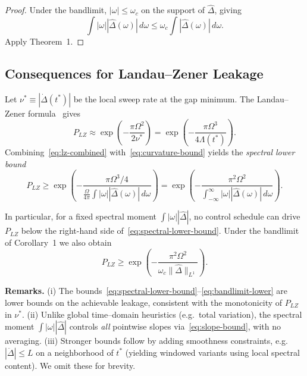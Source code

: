 \documentclass[11pt]{article}
\begin{document}
\begin{proof}
Under the bandlimit, $|\omega| \le \omega_c$ on the support of $\hat{\Delta}$, giving
\[
    \int |\omega| |\hat{\Delta}(\omega)|\, d\omega \le \omega_c \int |\hat{\Delta}(\omega)|\, d\omega.
\]
Apply Theorem~1.
\end{proof}

\subsection{Consequences for Landau--Zener Leakage}

Let $\nu^* \equiv |\dot{\Delta}(t^*)|$ be the local sweep rate at the gap minimum. The Landau--Zener formula~\cite{landau1932,zener1932,stueckelberg1932,majorana1932} gives
\begin{equation}
    P_{LZ} \approx \exp\left(-\frac{\pi\Omega^2}{2\nu^*}\right) = \exp\left(-\frac{\pi\Omega^3}{4\Lambda(t^*)}\right).
    \label{eq:lz-combined}
\end{equation}
Combining~\eqref{eq:lz-combined} with~\eqref{eq:curvature-bound} yields the \emph{spectral lower bound}
\begin{equation}
    P_{LZ} \ge \exp\left(-\frac{\pi\Omega^{3}/4}{\frac{\Omega}{4\pi}\int |\omega| |\hat{\Delta}(\omega)|\, d\omega}\right) = \exp\left(-\frac{\pi^2\Omega^2}{\int_{-\infty}^{\infty} |\omega| |\hat{\Delta}(\omega)|\, d\omega}\right).
    \label{eq:spectral-lower-bound}
\end{equation}

In particular, for a fixed spectral moment $\int |\omega| |\hat{\Delta}|$, no control schedule can drive $P_{LZ}$ below the right-hand side of~\eqref{eq:spectral-lower-bound}. Under the bandlimit of Corollary~1 we also obtain
\begin{equation}
    P_{LZ} \ge \exp\left(-\frac{\pi^2\Omega^2}{\omega_c \|\hat{\Delta}\|_{L^1}}\right).
    \label{eq:bandlimit-lower}
\end{equation}

\textbf{Remarks.} (i) The bounds~\eqref{eq:spectral-lower-bound}--\eqref{eq:bandlimit-lower} are lower bounds on the achievable leakage, consistent with the monotonicity of $P_{LZ}$ in $\nu^*$. (ii) Unlike global time--domain heuristics (e.g.\ total variation), the spectral moment $\int |\omega| |\hat{\Delta}|$ controls \emph{all} pointwise slopes via~\eqref{eq:slope-bound}, with no averaging. (iii) Stronger bounds follow by adding smoothness constraints, e.g.\ $|\ddot{\Delta}| \le L$ on a neighborhood of $t^*$ (yielding windowed variants using local spectral content). We omit these for brevity.
\end{document}

